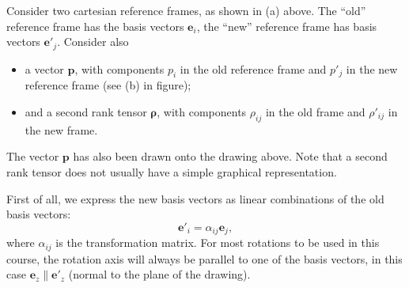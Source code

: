 Consider two cartesian reference frames, as shown in (a) above.  The ``old'' reference frame has the basis vectors $\mathbf{e}_{i}$,
the ``new'' reference frame has basis vectors $\mathbf{e}'_{j}$.  Consider also 
\begin{itemize}
\item a vector $\mathbf{p}$, with components $p_{i}$
in the old reference frame and $p'_{j}$ in the new reference frame (see (b) in figure);

\item and a second rank tensor $\bm{\rho}$, with components $\rho_{ij}$ in the old frame and $\rho'_{ij}$ in the new frame.
\end{itemize}
The vector $\mathbf{p}$ has also been drawn onto the drawing above.   Note that a second rank tensor does not usually have a simple graphical representation.

First of all, we express the new basis vectors as linear combinations of the old basis vectors:
\begin{equation}
	\mathbf{e}'_{i} = \alpha_{ij}\mathbf{e}_{j},
\end{equation}
where $\alpha_{ij}$ is the transformation matrix.  For most rotations to be used in this course, the rotation axis will always be parallel to one of the basis vectors, in this case $\mathbf{e}_{z}\parallel\mathbf{e}'_{z}$ (normal to the plane of the drawing).


